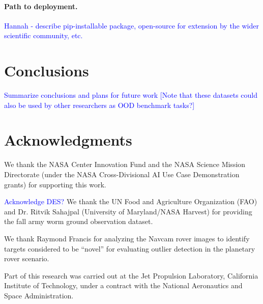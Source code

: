 \documentclass[letterpaper]{article} %
\newcommand{\todo}[1]{\textcolor{blue}{#1}}
\begin{document}
\paragraph{Path to deployment.} \todo{Hannah - describe pip-installable
package, open-source for extension by the wider scientific community, etc.}

\section{Conclusions}
\todo{
Summarize conclusions and plans for future work
[Note that these datasets could also be used by other researchers as OOD
 benchmark tasks?]
}




\section{Acknowledgments}
We thank the NASA Center Innovation Fund and the NASA Science Mission 
Directorate (under the NASA Cross-Divisional AI Use Case Demonstration grants)
 for supporting this work.

\todo{Acknowledge DES?}
We thank the UN Food and Agriculture Organization (FAO) and Dr. Ritvik Sahajpal
(University of Maryland/NASA Harvest) for providing the fall army worm ground
 observation dataset.

We thank Raymond Francis for analyzing the Navcam rover images to
identify targets considered to be ``novel'' for evaluating outlier
detection in the planetary rover scenario.

Part of this research was carried out at the Jet Propulsion
Laboratory, California Institute of Technology, under a contract with
the National Aeronautics and Space Administration.
\end{document}
